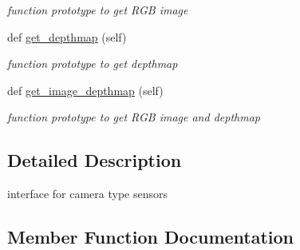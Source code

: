 \begin{DoxyCompactItemize}
\begin{DoxyCompactList}\small\item\em function prototype to get R\+GB image \end{DoxyCompactList}\item 
\mbox{\label{classrnb-planning_1_1src_1_1pkg_1_1detector_1_1camera_1_1camera__interface_1_1_camera_interface_a298291299d4c040784d7aa9ee6ff3b8c}} 
def \hyperlink{classrnb-planning_1_1src_1_1pkg_1_1detector_1_1camera_1_1camera__interface_1_1_camera_interface_a298291299d4c040784d7aa9ee6ff3b8c}{get\+\_\+depthmap} (self)
\begin{DoxyCompactList}\small\item\em function prototype to get depthmap \end{DoxyCompactList}\item 
\mbox{\label{classrnb-planning_1_1src_1_1pkg_1_1detector_1_1camera_1_1camera__interface_1_1_camera_interface_ad0ac6f593dc3a8c360ebde6b1cdbe31f}} 
def \hyperlink{classrnb-planning_1_1src_1_1pkg_1_1detector_1_1camera_1_1camera__interface_1_1_camera_interface_ad0ac6f593dc3a8c360ebde6b1cdbe31f}{get\+\_\+image\+\_\+depthmap} (self)
\begin{DoxyCompactList}\small\item\em function prototype to get R\+GB image and depthmap \end{DoxyCompactList}\end{DoxyCompactItemize}


\subsection{Detailed Description}
interface for camera type sensors 

\subsection{Member Function Documentation}
\mbox{\label{classrnb-planning_1_1src_1_1pkg_1_1detector_1_1camera_1_1camera__interface_1_1_camera_interface_abc12858f15df0e411f9d772b00c08106}} 
